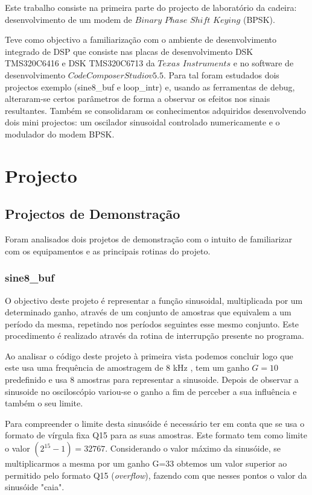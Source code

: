 \documentclass[11pt]{article}
\begin{document}
Este trabalho consiste na primeira parte do projecto de laboratório da cadeira: desenvolvimento de um modem de $Binary$ $Phase$ $Shift$ $Keying$ (BPSK). 

Teve como objectivo a familiarização com o ambiente de desenvolvimento integrado de DSP que consiste nas placas de desenvolvimento DSK TMS320C6416 e DSK TMS320C6713 da $Texas$ $Instruments$ e no software de desenvolvimento $Code Composer Studio v5.5$. Para tal foram estudados dois projectos exemplo (sine8\_buf e loop\_intr) e, usando as ferramentas de debug, alteraram-se certos parâmetros de forma a observar os efeitos nos sinais resultantes. Também se consolidaram os conhecimentos adquiridos desenvolvendo dois mini projectos: um oscilador sinusoidal controlado numericamente e o modulador do modem BPSK.

%
%

\section{Projecto}

\subsection{Projectos de Demonstração}
Foram analisados dois projetos de demonstração com o intuito de familiarizar com os equipamentos e as principais rotinas do projeto.

\subsubsection{sine8\_buf}
\label{sec:sine8}
O objectivo deste projeto é representar a função sinusoidal, multiplicada por um determinado ganho, através de um conjunto de amostras que equivalem a um período da mesma, repetindo nos períodos seguintes esse mesmo conjunto. Este procedimento é realizado através da rotina de interrupção presente no programa. 

Ao analisar o código deste projeto à primeira vista podemos concluir logo que este usa uma frequência de amostragem de 8 kHz , tem um ganho $G=10$ predefinido e usa 8 amostras para representar a sinusoide. Depois de observar a sinusoide no osciloscópio variou-se o ganho a fim de perceber a sua influência e também o seu limite.
 
Para compreender o limite desta sinusóide é necessário ter em conta que se usa o formato de vírgula fixa Q15 para as suas amostras. Este formato tem como limite o valor $(2^{15}-1) = 32767$. Considerando o valor máximo da sinusóide, se multiplicarmos a mesma por um ganho G=33 obtemos um valor superior ao permitido pelo formato Q15 (\textit{overflow}), fazendo com que nesses pontos o valor da sinusóide "caia".     
\end{document}
